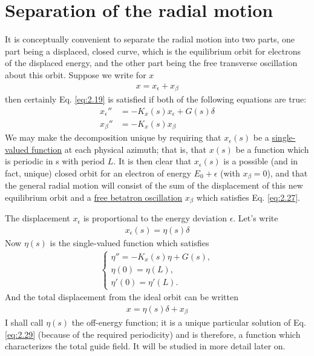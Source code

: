 \section{Separation of the radial motion} \label{sec:2.4}
It is conceptually convenient to separate the radial motion into two parts, one part being a displaced, closed curve, which is the equilibrium orbit for electrons of the displaced energy, and the other part being the free transverse oscillation about this orbit. Suppose we write for $x$
\begin{align}
	x = x_{\epsilon} + x_{\beta}\label{eq:2.25}
\end{align}
then certainly Eq. \eqref{eq:2.19} is satisfied if both of the following equations are true:
\begin{align}
	x_\epsilon'' &= -K_x(s)x_\epsilon + G(s)\delta\label{eq:2.26}\\
	x_\beta'' &= -K_x(s)x_\beta\label{eq:2.27}
\end{align}
We may make the decomposition unique by requiring that $x_\epsilon(s)$ be a \underline{single-valued function} at each physical azimuth; that is, that $x(s)$ be a function which is periodic in s with period $L$. It is then clear that $x_\epsilon(s)$ is a possible (and in fact, unique) closed orbit for an electron of energy $E_0 + \epsilon$ (with $x_\beta = 0$), and that the general radial motion will consist of the sum of the displacement of this new equilibrium orbit and a \underline{free betatron oscillation} $x_\beta$ which satisfies Eq. \eqref{eq:2.27}.

The displacement $x_\epsilon$ is proportional to the energy deviation $\epsilon$. Let’s write
\begin{align}
	x_\epsilon(s) = \eta(s)\delta\label{eq:2.28}
\end{align}
Now $\eta(s)$ is the single-valued function which satisfies
\begin{align}\label{eq:2.29}
	\begin{cases}
		\eta'' = -K_x(s)\eta + G(s), \\
        \eta(0) = \eta(L), \\
        \eta'(0) = \eta'(L).
    \end{cases}
\end{align}
And the total displacement from the ideal orbit can be written
\begin{align}
	x = \eta(s)\delta + x_\beta
\end{align}
I shall call $\eta(s)$ the off-energy function; it is a unique particular solution of Eq. \eqref{eq:2.29} (because of the required periodicity) and is therefore, a function which characterizes the total guide field. It will be studied in more detail later on.